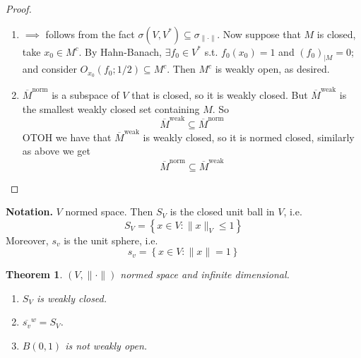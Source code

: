 \documentclass[11pt,a4paper]{article}
\theoremstyle{definition}
\theoremstyle{plain}
\newtheorem{theorem}[definition]{Theorem}
\theoremstyle{remark}
\renewcommand{\set}[1]{\left\{ #1 \right\}}
\newcommand{\norm}[1]{\lVert #1 \rVert}
\newcommand{\1}{\mathbbm{1}}
\begin{document}
\begin{proof}
    \begin{enumerate}
        \item $\implies$ follows from the fact $\sigma(V, V^*) \subseteq \sigma_{\norm{\cdot}}$. Now suppose that $M$ is closed, take $x_0 \in M^c$. By Hahn-Banach, 
        $\exists f_0 \in V^*$ s.t. $f_0(x_0) = 1$ and $(f_0)_{|M} = 0$; and consider $O_{x_0} (f_0; 1/2) \subseteq M^c$. 
        Then $M^c$ is weakly open, as desired.
        
        \item $\overline{M}^{\text{norm}}$ is a subspace of $V$ that is closed, so it is weakly closed. But $\overline{M}^{\text{weak}}$ is the smallest weakly closed 
        set containing $M$. So 
        $$\overline{M}^{\text{weak}} \subseteq \overline{M}^{\text{norm}}$$
        OTOH we have that $\overline{M}^{\text{weak}}$ is weakly closed, so it is normed closed, similarly as above we get 
        $$\overline{M}^{\text{norm}} \subseteq \overline{M}^{\text{weak}}$$
    \end{enumerate}
\end{proof}

\textbf{Notation.} $V$ normed space. Then $S_V$ is the closed unit ball in $V$, i.e. 
$$S_V = \set{x \in V \colon \norm{x}_V \le 1}$$
Moreover, $s_v$ is the unit sphere, i.e. 
$$s_v = \set{x \in V \colon \norm{x} = 1}$$

\begin{theorem}
    $(V, \norm{\cdot})$ normed space and infinite dimensional. 
    \begin{enumerate}[label = \alph*)]
        \item $S_V$ is weakly closed.
        \item  $\overline{s_v}^w = S_V$. 
        \item $B(0, 1)$ is not weakly open.
    \end{enumerate}
\end{theorem}
\end{document}

